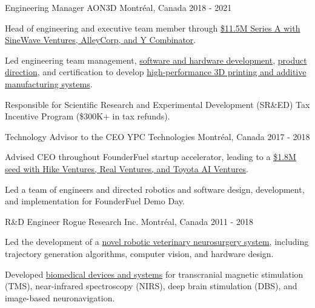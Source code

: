 \begin{cventries}
    \cventry
    {Engineering Manager}
    {AON3D}
    {Montréal, Canada}
    {2018 - 2021}
    {
        \begin{cvitems}
            \item{Head of engineering and executive team member through \href{https://techcrunch.com/2021/09/02/3d-printing-startup-aon3d-closes-11-5m-series-a/}{\$11.5M Series A with SineWave Ventures, AlleyCorp, and Y Combinator}.}
            \item{Led engineering team management, \href{https://www.nicholasnadeau.com/talk/making-materials-matter/}{software and hardware development}, \href{https://www.nicholasnadeau.com/talk/the-products-by-design-podcast/}{product direction}, and certification to develop \href{https://www.aon3d.com/}{high-performance 3D printing and additive manufacturing systems}.}
            \item{Responsible for Scientific Research and Experimental Development (SR\&ED) Tax Incentive Program (\$300K+ in tax refunds).}
        \end{cvitems}
    }


    \cventry
    {Technology Advisor to the CEO}
    {YPC Technologies}
    {Montréal, Canada}
    {2017 - 2018}
    {
        \begin{cvitems}
            \item{Advised CEO throughout FounderFuel startup accelerator, leading to a \href{https://www.ypc-technologies.com/ypc-seed-round-oct2020}{\$1.8M seed with Hike Ventures, Real Ventures, and Toyota AI Ventures}.}
            \item{Led a team of engineers and directed robotics and software design, development, and implementation for FounderFuel Demo Day.}
        \end{cvitems}
    }

    \cventry
    {R\&D Engineer}
    {Rogue Research Inc.}
    {Montréal, Canada}
    {2011 - 2018}
    {
        \begin{cvitems}
            \item{Led the development of a \href{https://www.nicholasnadeau.com/publication/nadeau-2017-characterization/}{novel robotic veterinary neurosurgery system}, including trajectory generation algorithms, computer vision, and hardware design.}
            \item{Developed \href{https://www.rogue-research.com/}{biomedical devices and systems} for transcranial magnetic stimulation (TMS), near-infrared spectroscopy (NIRS), deep brain stimulation (DBS), and image-based neuronavigation.}
        \end{cvitems}
    }

\end{cventries}
